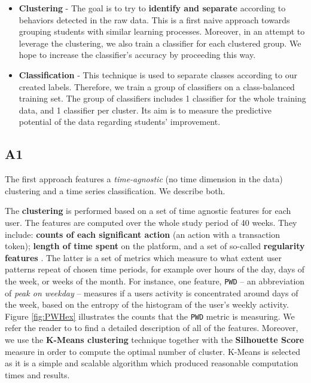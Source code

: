 \documentclass[sigplan,screen]{acmart}
\begin{document}
\begin{itemize}
    \item \textbf{Clustering} - The goal is to try to \textbf{identify and separate} according to behaviors detected in the raw data. This is a first naive approach towards grouping students with similar learning processes. Moreover, in an attempt to leverage the clustering, we also train a classifier for each clustered group. We hope to increase the classifier's accuracy by proceeding this way.
    \item \textbf{Classification} - This technique is used to separate classes according to our created labels. Therefore, we train a group of classifiers on a class-balanced training set. The group of classifiers includes 1 classifier for the whole training data, and 1 classifier per cluster. Its aim is to measure the predictive potential of the data regarding students' improvement. %
\end{itemize}

\subsection{A1}\label{subsec:A1}

The first approach features a \textit{time-agnostic} (no time dimension in the data) clustering and a time series classification. We describe both.

The \textbf{clustering} is performed based on a set of time agnostic features for each user. The features are computed over the whole study period of 40 weeks. They include: \textbf{counts of each significant action} (an action with a transaction token); \textbf{length of time spent} on the platform, and a set of so-called \textbf{regularity features} \cite{quantifyreg}. The latter is a set of metrics which measure to what extent user patterns repeat of chosen time periods, for example over hours of the day, days of the week, or weeks of the month. For instance, one feature, \texttt{PWD} -- an abbreviation of \textit{peak on weekday} -- measures if a users activity is concentrated around days of the week, based on the entropy of the histogram of the user's weekly activity. Figure \ref{fig:PWHex} illustrates the counts that the \texttt{PWD} metric is measuring. We refer the reader to \cite{quantifyreg} to find a detailed description of all of the features. Moreover, we use the \textbf{K-Means clustering} technique together with the \textbf{Silhouette Score} measure in order to compute the optimal number of cluster. K-Means is selected as it is a simple and scalable algorithm which produced reasonable computation times and results.
\end{document}
